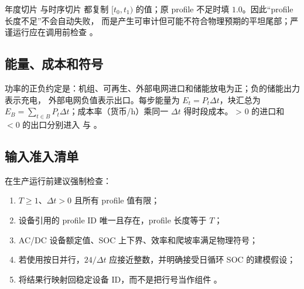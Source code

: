 年度切片  与时序切片  都复制
$[t_0,t_1)$ 的值；原 profile 不足时填 $1.0$。因此“profile 长度不足”不会自动失败，
而是产生可审计但可能不符合物理预期的平坦尾部；严谨运行应在调用前检查
。

\subsection{能量、成本和符号}
功率的正负约定是：机组、可再生、外部电网进口和储能放电为正；负的储能出力表示充电，
外部电网负值表示出口。每步能量为 $E_t=P_t\Delta t$，块汇总为
$E_B=\sum_{t\in B}P_t\Delta t$；成本率（货币/h）乘同一 $\Delta t$ 得时段成本。
 > 0 的进口和 $<0$ 的出口分别进入
 与 。

\subsection{输入准入清单}
在生产运行前建议强制检查：
\begin{enumerate}
  \item $T\ge1$、$\Delta t>0$ 且所有 profile 值有限；
  \item 设备引用的 profile ID 唯一且存在，profile 长度等于 $T$；
  \item AC/DC 设备额定值、SOC 上下界、效率和爬坡率满足物理符号；
  \item 若使用按日并行，$24/\Delta t$ 应接近整数，并明确接受日循环 SOC 的建模假设；
  \item 将结果行映射回稳定设备 ID，而不是把行号当作组件 。
\end{enumerate}
